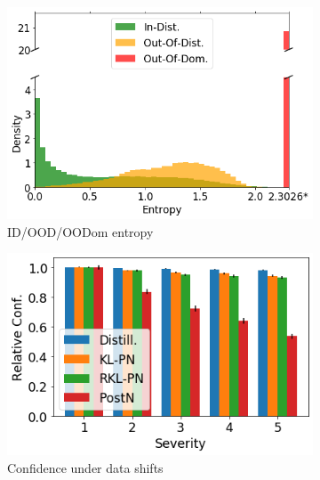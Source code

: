 \begin{figure}[H]
    \centering
    \begin{subfigure}[t]{0.33 \textwidth}
        \centering
        \includegraphics[width=.98 \textwidth]{sections/006_neurips2020/figures/entropy_CIFAR10.png}
        \caption{ID/OOD/OODom entropy}
    \end{subfigure}%
    \begin{subfigure}[t]{0.33 \textwidth}
        \centering
        \includegraphics[width=.98 \textwidth]{sections/006_neurips2020/figures/shifts_CIFAR10_conf.png}
        \caption{Confidence under data shifts}
    \end{subfigure}%
    \begin{subfigure}[t]{0.33 \textwidth}
        \centering

\end{subfigure}
\end{figure}
